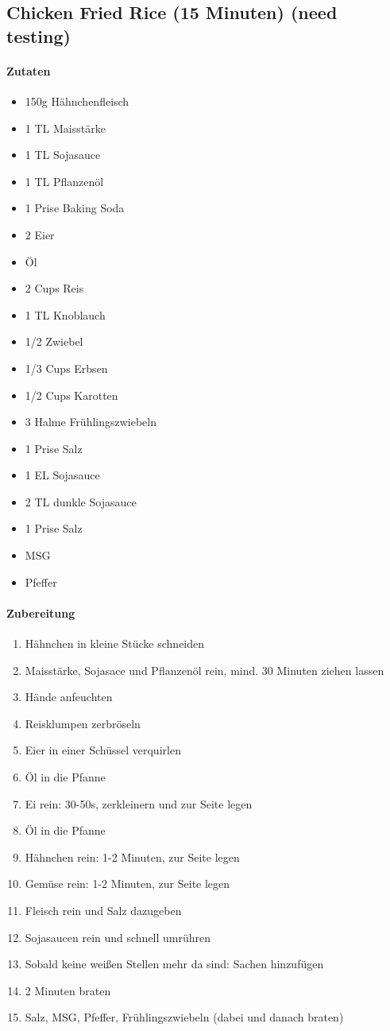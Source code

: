 \newpage
\subsection{Chicken Fried Rice (15 Minuten) (need testing)}
\paragraph{Zutaten}
\begin{itemize}[noitemsep]
	\item 150g Hähnchenfleisch 
	\item 1 TL Maisstärke
	\item 1 TL Sojasauce
	\item 1 TL Pflanzenöl
	\item 1 Prise Baking Soda
	\vspace{0.5cm}
	\item 2 Eier
	\item Öl
	\item 2 Cups Reis 
	\item 1 TL Knoblauch
	\item 1/2 Zwiebel
	\item 1/3 Cups Erbsen
	\item 1/2 Cups Karotten 
	\item 3 Halme Frühlingszwiebeln
	\item 1 Prise Salz
	\item 1 EL Sojasauce
	\item 2 TL dunkle Sojasauce
	\item 1 Prise Salz
	\item MSG
	\item Pfeffer
\end{itemize}
\paragraph{Zubereitung}
\begin{enumerate}[noitemsep]
	\item Hähnchen in kleine Stücke schneiden
	\item Maisstärke, Sojasace und Pflanzenöl rein, mind. 30 Minuten ziehen lassen
	\item Hände anfeuchten
	\item Reisklumpen zerbröseln
	\item Eier in einer Schüssel verquirlen
	\item Öl in die Pfanne 
	\item Ei rein: 30-50s, zerkleinern und zur Seite legen
	\item Öl in die Pfanne
	\item Hähnchen rein: 1-2 Minuten, zur Seite legen
	\item Gemüse rein: 1-2 Minuten, zur Seite legen
	\item Fleisch rein und Salz dazugeben
	\item Sojasaucen rein und schnell umrühren
	\item Sobald keine weißen Stellen mehr da sind: Sachen hinzufügen
	\item 2 Minuten braten
	\item Salz, MSG, Pfeffer, Frühlingszwiebeln (dabei und danach braten)
\end{enumerate}
